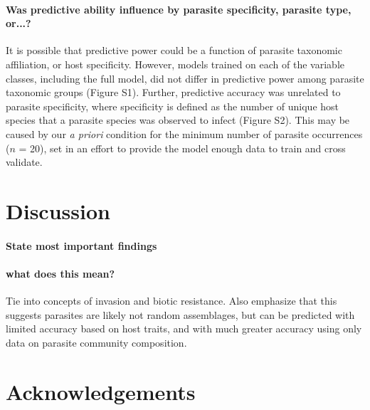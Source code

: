 \documentclass[12pt]{article}
\begin{document}
  
  \paragraph{Was predictive ability influence by parasite specificity, parasite type, or...?} 
  
  It is possible that predictive power could be a function of parasite taxonomic affiliation, or host specificity. However, models trained on each of the variable classes, including the full model, did not differ in predictive power among parasite taxonomic groups (Figure S1). Further, predictive accuracy was unrelated to parasite specificity, where specificity is defined as the number of unique host species that a parasite species was observed to infect (Figure S2). This may be caused by our \textit{a priori} condition for the minimum number of parasite occurrences ($n$ = 20), set in an effort to provide the model enough data to train and cross validate.  
 
 
 
  

\section{Discussion}
 
  \paragraph{State most important findings}
  
  
  
  
  \paragraph{what does this mean?}
  Tie into concepts of invasion and biotic resistance. Also emphasize that this suggests parasites are likely not random assemblages, but can be predicted with limited accuracy based on host traits, and with much greater accuracy using only data on parasite community composition. 
 
 
 
  \paragraph{}
 
 
 
 
 
 
 
 
 
\section{Acknowledgements}
\end{document}
